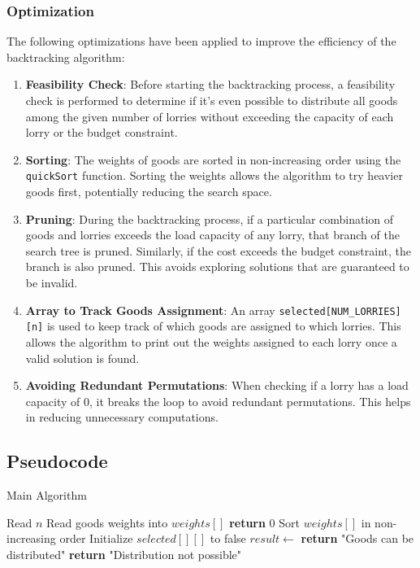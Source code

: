 \documentclass{article}
\begin{document}
\subsubsection{Optimization}
The following optimizations have been applied to improve the efficiency of the backtracking algorithm:
\begin{enumerate}
	\item \textbf{Feasibility Check}: Before starting the backtracking process, a feasibility check is performed to determine if it's even possible to distribute all goods among the given number of lorries without exceeding the capacity of each lorry or the budget constraint.

	\item \textbf{Sorting}: The weights of goods are sorted in non-increasing order using the \texttt{quickSort} function. Sorting the weights allows the algorithm to try heavier goods first, potentially reducing the search space.

	\item \textbf{Pruning}: During the backtracking process, if a particular combination of goods and lorries exceeds the load capacity of any lorry, that branch of the search tree is pruned. Similarly, if the cost exceeds the budget constraint, the branch is also pruned. This avoids exploring solutions that are guaranteed to be invalid.

	\item \textbf{Array to Track Goods Assignment}: An array \texttt{selected[NUM\_LORRIES][n]} is used to keep track of which goods are assigned to which lorries. This allows the algorithm to print out the weights assigned to each lorry once a valid solution is found.

	\item \textbf{Avoiding Redundant Permutations}: When checking if a lorry has a load capacity of 0, it breaks the loop to avoid redundant permutations. This helps in reducing unnecessary computations.
\end{enumerate}

\subsection{Pseudocode}
\begin{algorithm}
	\caption{Main Algorithm}
	\label{algo:main}
	\begin{algorithmic}[1]
		\State Read $n$
		\State Read goods weights into $weights[]$
		\State \textbf{return} 0
		\Else
		\State Sort $weights[]$ in non-increasing order
		\State Initialize $selected[][]$ to false
		\State $result \gets$ 
		\State \textbf{return} "Goods can be distributed"
		\Else
		\State \textbf{return} "Distribution not possible"
		\EndIf
		\EndIf
		\EndFunction
	\end{algorithmic}
\end{algorithm}
\end{document}
